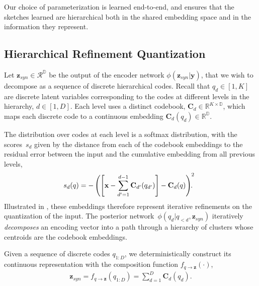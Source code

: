 \documentclass[11pt]{article}
\begin{document}
Our choice of parameterization is learned end-to-end, and ensures that the sketches learned are hierarchical both in the shared embedding space and in the information they represent. 

\subsection{Hierarchical Refinement Quantization}










Let $\textbf{z}_{syn} \in \mathcal{R}^\mathbb{D}$ be the output of the encoder network $\phi(\textbf{z}_{syn} | \textbf{y})$, that we wish to decompose as a sequence of discrete hierarchical codes. Recall that $q_d \in [1, K]$ are discrete latent variables corresponding to the codes at different levels in the hierarchy, $d \in [1, D]$.
Each level uses a distinct codebook, $\textbf{C}_d \in \mathbb{R}^{K \times \mathbb{D}}$, which maps each discrete code to a continuous embedding $\textbf{C}_d(q_d) \in \mathbb{R}^{\mathbb{D}}$.


 The distribution over codes at each level is a softmax distribution, with the scores~$s_d$ given by the distance from each of the codebook embeddings to the residual error between the input and the cumulative embedding from all previous levels, 
\begin{align}
\hspace{-0.25cm} s_d(q) = - \left( \left[\textbf{x} - \sum\limits_{d'=1}^{d-1} \textbf{C}_{d'}(q_{d'}) \right ] - \textbf{C}_d(q)  \right ) ^2\hspace{-0.25cm} .
\end{align}
Illustrated in , these embeddings therefore represent iterative refinements on the quantization of the input. The posterior network~$\phi(q_d | q_{< d}, \textbf{z}_{syn})$ iteratively \textit{decomposes} an encoding vector into a path through a hierarchy of clusters whose centroids are the codebook embeddings.



Given a sequence of discrete codes $q_{1:D}$, we deterministically construct its continuous representation with the composition function $f_{q \rightarrow \textbf{z}}(\cdot)$,
\begin{align}
\textbf{z}_{syn} = f_{q \rightarrow \textbf{z}}(q_{1:D}) = \sum\limits_{d=1}^{D} \textbf{C}_d(q_{d}).
\end{align}
\end{document}

